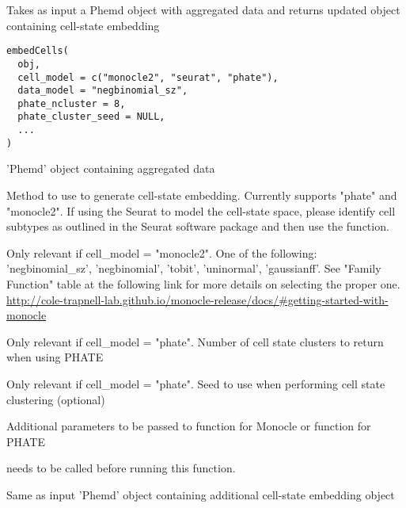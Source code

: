 \documentclass[a4paper]{book}
\begin{document}
%
\begin{Description}\relax
Takes as input a Phemd object with aggregated data and returns updated object containing cell-state embedding
\end{Description}
%
\begin{Usage}
\begin{verbatim}
embedCells(
  obj,
  cell_model = c("monocle2", "seurat", "phate"),
  data_model = "negbinomial_sz",
  phate_ncluster = 8,
  phate_cluster_seed = NULL,
  ...
)
\end{verbatim}
\end{Usage}
%
\begin{Arguments}
\begin{ldescription}
\item[\code{obj}] 'Phemd' object containing aggregated data

\item[\code{cell\_model}] Method to use to generate cell-state embedding. Currently supports "phate" and "monocle2". If using the Seurat to model the cell-state space, please identify cell subtypes as outlined in the Seurat software package and then use the  function.

\item[\code{data\_model}] Only relevant if cell\_model = "monocle2". One of the following: 'negbinomial\_sz', 'negbinomial', 'tobit', 'uninormal', 'gaussianff'. See "Family Function" table at the following link for more details on selecting the proper one. \url{http://cole-trapnell-lab.github.io/monocle-release/docs/#getting-started-with-monocle}

\item[\code{phate\_ncluster}] Only relevant if cell\_model = "phate". Number of cell state clusters to return when using PHATE

\item[\code{phate\_cluster\_seed}] Only relevant if cell\_model = "phate". Seed to use when performing cell state clustering (optional)

\item[\code{...}] Additional parameters to be passed to  function for Monocle or  function for PHATE
\end{ldescription}
\end{Arguments}
%
\begin{Details}\relax
{} needs to be called before running this function.
\end{Details}
%
\begin{Value}
Same as input 'Phemd' object containing additional cell-state embedding object
\end{Value}
\end{document}
